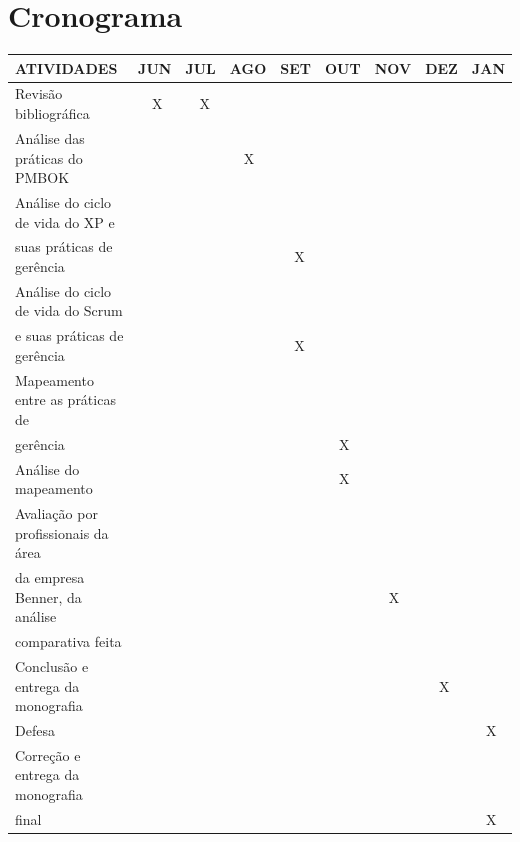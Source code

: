 \documentclass[
    12pt,               %
    openright,          %
    twoside,            %
    a4paper,            %
    chapter=TITLE,     %
    english,            %
    spanish,            %
    portuguese              %
    ]{abntex2}
\begin{document}
\chapter{Cronograma}

\begin{table}[h]
\centering
\begin{tabular}{|l|l|l|l|l|l|l|l|l|} \hline
ATIVIDADES                             &JUN & JUL & AGO & SET & OUT & NOV & DEZ & JAN  \\ \hline\hline
Revisão bibliográfica                  &\ \ X &\ \ X &   &     &     &     &     &     \\ \hline
Análise das práticas do PMBOK          &     &     &\ \ X &    &     &     &     &     \\ \hline
Análise do ciclo de vida do XP e 	   &	 &	   &	 &	   &	 &	   &	 &	    \\
suas práticas de gerência              &     &     &     &\ \ X &    &     &     &     \\ \hline
Análise do ciclo de vida do Scrum 	   &	 &	   &	 &	   &	 &	   &	 &      \\
e suas práticas de gerência            &     &     &     &\ \ X &    &     &     &     \\ \hline
Mapeamento entre as práticas de        &     &     &     &     &     &     &     &      \\
gerência                               &     &     &     &     &\ \ X &    &     &     \\ \hline
Análise do mapeamento                  &     &     &     &     &\ \ X &    &     &     \\ \hline
Avaliação por profissionais da área    &     &     &     &     &     &     &     &      \\
da empresa Benner, da análise          &     &     &     &     &     &\ \ X &    &     \\ 
comparativa feita                      &     &     &     &     &     &     &     &      \\ \hline
Conclusão e entrega da monografia      &     &     &     &     &     &     &\ \ X &     \\ \hline
Defesa                                 &     &     &     &     &     &     &     &\ \ X \\ \hline
Correção e entrega da monografia       &     &     &     &     &     &     &     &      \\
final                                  &     &     &     &     &     &     &     &\ \ X  \\ \hline
\end{tabular}
\end{table}
\end{document}
